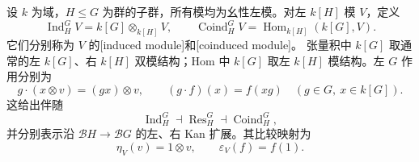 \begin{proposition}\label{b4:prop:kan-induction-coinduction}
	设 \(k\) 为域，\(H\le G\) 为群的子群，所有模均为幺性左模。对左 \(k[H]\) 模 \(V\)，定义
	\[
		\operatorname{Ind}^G_H V=k[G]\otimes_{k[H]}V,
		\qquad
		\operatorname{Coind}^G_H V=
		\operatorname{Hom}_{k[H]}(k[G],V).
	\]
	它们分别称为 \(V\) 的[induced module]和[coinduced module]。
	张量积中 \(k[G]\) 取通常的左 \(k[G]\)、右 \(k[H]\) 双模结构；Hom 中 \(k[G]\) 取左 \(k[H]\) 模结构。左 \(G\) 作用分别为
	\[
		g\cdot(x\otimes v)=(gx)\otimes v,
		\qquad
		(g\cdot f)(x)=f(xg)
		\quad(g\in G,\ x\in k[G]).
	\]
	这给出伴随
	\[
		\operatorname{Ind}^G_H\dashv
		\operatorname{Res}^G_H\dashv
		\operatorname{Coind}^G_H,
	\]
	并分别表示沿 \(\mathcal BH\rightarrow\mathcal BG\) 的左、右 Kan 扩展。其比较映射为
	\[
		\eta_V(v)=1\otimes v,\qquad
		\varepsilon_V(f)=f(1).
	\]
\end{proposition}
